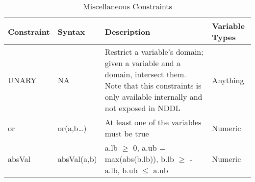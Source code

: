 \begin{table*}[ht]
  \centering
  \renewcommand{\arraystretch}{1.0}%
  \begin{tabular}{|l|l|p{10cm}|p{3cm}|}
    \hline
    \textbf{Constraint}& \textbf{Syntax}& \textbf{Description}& \textbf{Variable Types}\\
    \hline
    UNARY& NA& Restrict a variable's domain; given a variable and a domain, intersect them. Note that this constraints is only available internally and not exposed in NDDL& Anything\\
    \hline
    or& or(a,b\ldots)& At least one of the variables must be true& Numeric\\
    \hline
    absVal& absVal(a,b)& a.lb $\geq$ 0, a.ub = max(abs(b.lb)), b.lb $\geq$ -a.lb, b.ub $\leq$ a.ub& Numeric\\
    \hline
  \end{tabular}
 \caption{\small Miscellaneous Constraints}
  \label{tab:misc}
\end{table*}

